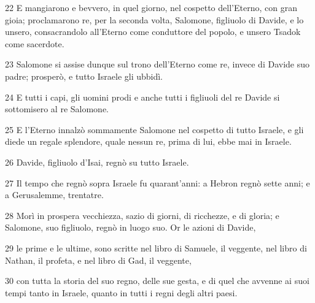 \par 22 E mangiarono e bevvero, in quel giorno, nel cospetto dell'Eterno, con gran gioia; proclamarono re, per la seconda volta, Salomone, figliuolo di Davide, e lo unsero, consacrandolo all'Eterno come conduttore del popolo, e unsero Tsadok come sacerdote.
\par 23 Salomone si assise dunque sul trono dell'Eterno come re, invece di Davide suo padre; prosperò, e tutto Israele gli ubbidì.
\par 24 E tutti i capi, gli uomini prodi e anche tutti i figliuoli del re Davide si sottomisero al re Salomone.
\par 25 E l'Eterno innalzò sommamente Salomone nel cospetto di tutto Israele, e gli diede un regale splendore, quale nessun re, prima di lui, ebbe mai in Israele.
\par 26 Davide, figliuolo d'Isai, regnò su tutto Israele.
\par 27 Il tempo che regnò sopra Israele fu quarant'anni: a Hebron regnò sette anni; e a Gerusalemme, trentatre.
\par 28 Morì in prospera vecchiezza, sazio di giorni, di ricchezze, e di gloria; e Salomone, suo figliuolo, regnò in luogo suo. Or le azioni di Davide,
\par 29 le prime e le ultime, sono scritte nel libro di Samuele, il veggente, nel libro di Nathan, il profeta, e nel libro di Gad, il veggente,
\par 30 con tutta la storia del suo regno, delle sue gesta, e di quel che avvenne ai suoi tempi tanto in Israele, quanto in tutti i regni degli altri paesi.


